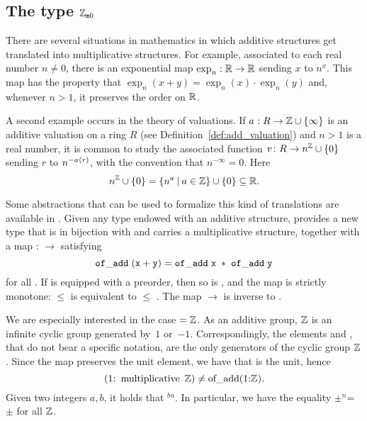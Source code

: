 \documentclass[sigplan,screen]{acmart}
\begin{document}
\subsection{\texorpdfstring{The type $\mathbb{Z}_{\mathtt{m}0}$}{The type with\_zero multiplicative Z}}\label{subsection:wzmZZ}
There are several situations in mathematics in which additive structures get translated into multiplicative structures. For example, associated to each real number $n \ne 0$, there is an exponential map $\exp_n : \mathbb{R} \to \mathbb{R}$ sending $x$ to $n^x$. This map has the property that
$\exp_n(x + y) = \exp_n(x) \cdot \exp_n(y)$ and, whenever $n > 1$, it preserves the order on $\mathbb{R}$.

A second example occurs in the theory of valuations. If $\av : R \to \ZZ \cup \{\infty\}$ is an additive valuation on a ring $R$ (see Definition~\ref{def:add_valuation}) and $n > 1$ is a real number, it is common to study the associated function $v \colon R \rightarrow n^{\mathbb{Z}} \cup \{0\}$ sending $r$ to $n^{-\av(r)}$, with the convention that $n^{-\infty} = 0$. Here
\[ n^{\mathbb{Z}} \cup \{0\}=\{n^a \:\vert\: a \in \mathbb{Z}\} \cup \{0\}\subseteq \mathbb{R}. \]

Some abstractions that can be used to formalize this kind of translations are available in \mathlib. Given any type  endowed with an additive structure, \mathlib provides a new type  that is in bijection with  and carries a multiplicative structure, together with a map
 :  $\rightarrow$  satisfying
\[
    \mathtt{\ of\_add\; (x + y) = of\_add\; x\; *\; of\_add\; y\ }
\]
for all . If  is equipped with a preorder, then so is , and the map  is strictly monotone:  $\le$  is equivalent to  $\le$ . The map  $\to$  is inverse to .

We are especially interested in the case  $= \mathbb{Z}$. As an additive group, $\mathbb{Z}$ is an infinite cyclic group generated by~$1$ or~$-1$. Correspondingly, the elements  and , that do not bear a specific notation, are the only generators of the cyclic group \;$\mathbb{Z}$. Since the map  preserves the unit element, we have that  is the unit, hence
\[
\text{\code{(1:}}\;\text{\code{multiplicative} }\ZZ)\neq\text{\code{of_add(1:}}\ZZ\text{\code{)}}.
\]
Given two integers $a, b$, it holds that $^b$$^a$. In particular, we have the equality $\pm$$^n$= $\pm$ for all  $\mathbb{Z}$\code{)}.
\end{document}
